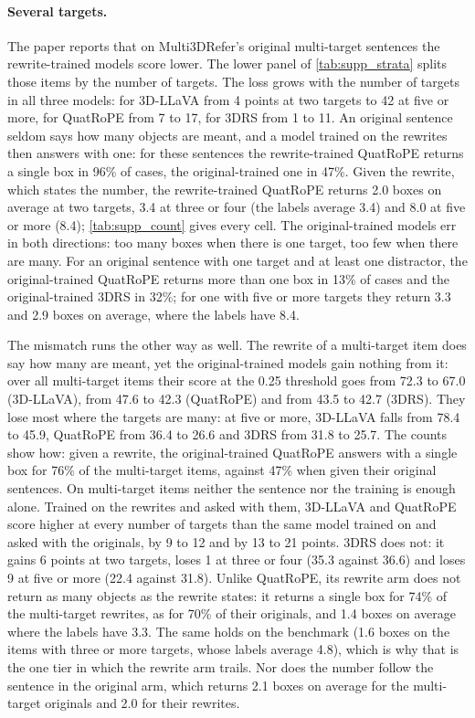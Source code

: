 \paragraph{Several targets.}
The paper reports that on Multi3DRefer's original multi-target sentences the rewrite-trained models score lower.
The lower panel of \cref{tab:supp_strata} splits those items by the number of targets.
The loss grows with the number of targets in all three models: for 3D-LLaVA from 4 points at two targets to 42 at five or more, for QuatRoPE from 7 to 17, for 3DRS from 1 to 11.
An original sentence seldom says how many objects are meant, and a model trained on the rewrites then answers with one: for these sentences the rewrite-trained QuatRoPE returns a single box in 96\% of cases, the original-trained one in 47\%.
Given the rewrite, which states the number, the rewrite-trained QuatRoPE returns 2.0 boxes on average at two targets, 3.4 at three or four (the labels average 3.4) and 8.0 at five or more (8.4); \cref{tab:supp_count} gives every cell.
The original-trained models err in both directions: too many boxes when there is one target, too few when there are many.
For an original sentence with one target and at least one distractor, the original-trained QuatRoPE returns more than one box in 13\% of cases and the original-trained 3DRS in 32\%; for one with five or more targets they return 3.3 and 2.9 boxes on average, where the labels have 8.4.

The mismatch runs the other way as well.
The rewrite of a multi-target item does say how many are meant, yet the original-trained models gain nothing from it: over all multi-target items their score at the 0.25 threshold goes from 72.3 to 67.0 (3D-LLaVA), from 47.6 to 42.3 (QuatRoPE) and from 43.5 to 42.7 (3DRS).
They lose most where the targets are many: at five or more, 3D-LLaVA falls from 78.4 to 45.9, QuatRoPE from 36.4 to 26.6 and 3DRS from 31.8 to 25.7.
The counts show how: given a rewrite, the original-trained QuatRoPE answers with a single box for 76\% of the multi-target items, against 47\% when given their original sentences.
On multi-target items neither the sentence nor the training is enough alone.
Trained on the rewrites and asked with them, 3D-LLaVA and QuatRoPE score higher at every number of targets than the same model trained on and asked with the originals, by 9 to 12 and by 13 to 21 points.
3DRS does not: it gains 6 points at two targets, loses 1 at three or four (35.3 against 36.6) and loses 9 at five or more (22.4 against 31.8).
Unlike QuatRoPE, its rewrite arm does not return as many objects as the rewrite states: it returns a single box for 74\% of the multi-target rewrites, as for 70\% of their originals, and 1.4 boxes on average where the labels have 3.3.
The same holds on the benchmark (1.6 boxes on the items with three or more targets, whose labels average 4.8), which is why that is the one tier in which the rewrite arm trails.
Nor does the number follow the sentence in the original arm, which returns 2.1 boxes on average for the multi-target originals and 2.0 for their rewrites.

